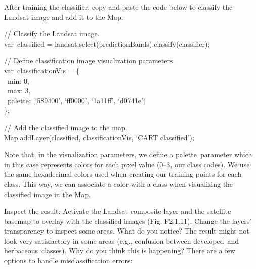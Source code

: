 \documentclass[
  letterpaper,
  DIV=11,
  numbers=noendperiod]{scrreprt}
\begin{document}
After training the classifier, copy and paste the code below to classify
the Landsat image and add it to the Map.

// Classify the Landsat image.\\
var~classified = landsat.select(predictionBands).classify(classifier);

// Define classification image visualization parameters.\\
var~classificationVis = \{\\
\hspace*{0.333em} ~min: 0,\\
\hspace*{0.333em} ~max: 3,\\
\hspace*{0.333em} ~palette: {[}`589400', `ff0000', `1a11ff',
`d0741e'{]}\\
\};

// Add the classified image to the map.\\
Map.addLayer(classified, classificationVis, `CART classified');

Note that, in the visualization parameters, we define a
palette~parameter which in this case represents colors for each pixel
value (0--3, our class codes). We use the same hexadecimal colors used
when creating our training points for each class. This way, we can
associate a color with a class when visualizing the classified image in
the Map.

Inspect the result: Activate the Landsat composite layer and the
satellite basemap to overlay with the classified images (Fig. F2.1.11).
Change the layers' transparency to inspect some areas. What do you
notice? The result might not look very satisfactory in some areas (e.g.,
confusion between developed~and herbaceous~classes). Why do you think
this is happening? There are a few options to handle misclassification
errors:
\end{document}
